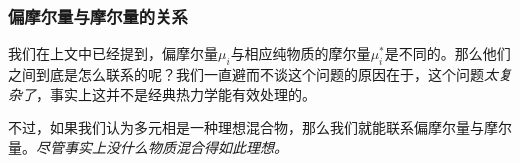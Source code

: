\subsubsection{偏摩尔量与摩尔量的关系}
我们在上文中已经提到，偏摩尔量$\mu_i$与相应纯物质的摩尔量$\mu_i^*$是不同的。那么他们之间到底是怎么联系的呢？我们一直避而不谈这个问题的原因在于，这个问题\textsl{太复杂了}，事实上这并不是经典热力学能有效处理的。

不过，如果我们认为多元相是一种理想混合物，那么我们就能联系偏摩尔量与摩尔量。\textsl{尽管事实上没什么物质混合得如此理想。}



